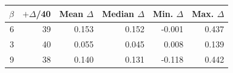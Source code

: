 \begin{tabular}{@{}rrrrrr@{}}
\toprule
$\beta$ & $+\Delta$/40 & Mean $\Delta$ & Median $\Delta$ & Min. $\Delta$ & Max. $\Delta$\\
\midrule
6 & 39 & 0.153 & 0.152 & -0.001 & 0.437\\
3 & 40 & 0.055 & 0.045 & 0.008 & 0.139\\
9 & 38 & 0.140 & 0.131 & -0.118 & 0.442\\
\bottomrule
\end{tabular}
